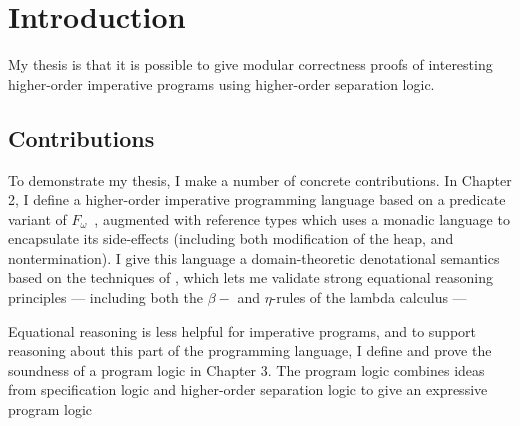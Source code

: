 \chapter{Introduction}

My thesis is that it is possible to give modular correctness proofs of
interesting higher-order imperative programs using higher-order
separation logic.


\section{Contributions}

To demonstrate my thesis, I make a number of concrete contributions.
In Chapter 2, I define a higher-order imperative programming language
based on a predicate variant of $F_\omega$~\citep{fomega}, augmented
with reference types which uses a monadic language to encapsulate its
side-effects (including both modification of the heap, and
nontermination). I give this language a domain-theoretic denotational
semantics based on the techniques of \citet{smyth-plotkin}, which lets
me validate strong equational reasoning principles --- including both
the $\beta-$ and $\eta$-rules of the lambda calculus ---

Equational reasoning is less helpful for imperative programs, and to
support reasoning about this part of the programming language, I
define and prove the soundness of a program logic in Chapter 3. The
program logic combines ideas from specification logic and higher-order
separation logic to give an expressive program logic 
